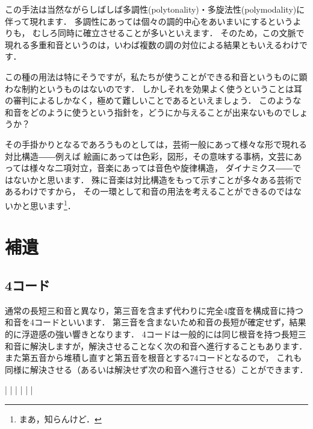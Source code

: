 \documentclass[dvipdfmx,uplatex,b5paper,openany,jbase=12Q,nomag*,textwidth-limit=44%
               ]{gachimuchi}[2020/05/05]
\begin{document}
この手法は当然ながらしばしば多調性(polytonality)・多旋法性(polymodality)に伴って現れます．
多調性にあっては個々の調的中心をあいまいにするというよりも，
むしろ同時に確立させることが多いといえます．
そのため，この文脈で現れる多重和音というのは，いわば複数の調の対位による結果ともいえるわけです．

この種の用法は特にそうですが，私たちが使うことができる和音というものに顕わな制約というものはないのです．
しかしそれを効果よく使うということは耳の審判によるしかなく，極めて難しいことであるといえましょう．
このような和音をどのように使うという指針を，どうにか与えることが出来ないものでしょうか？

その手掛かりとなるであろうものとしては，芸術一般にあって様々な形で現れる対比構造――例えば
絵画にあっては色彩，図形，その意味する事柄，文芸にあっては様々な二項対立，音楽にあっては音色や旋律構造，
ダイナミクス――ではないかと思います．
殊に音楽は対比構造をもって示すことが多々ある芸術であるわけですから，
その一環として和音の用法を考えることができるのではないかと思います\footnote{まあ，知らんけど．
}．

\chapter{補遺}
\section{\Sus4コード}
通常の長短三和音と異なり，第三音を含まず代わりに完全4度音を構成音に持つ和音を\Sus4コードといいます．
第三音を含まないため和音の長短が確定せず，結果的に浮遊感の強い響きとなります．
\Sus4コードは一般的には同じ根音を持つ長短三和音に解決しますが，解決させることなく次の和音へ進行することもあります．
また第五音から堆積し直すと第五音を根音とする7\Sus4コードとなるので，
これも同様に解決させる（あるいは解決せず次の和音へ進行させる）ことができます．

\begin{Music}[0.8\linewidth]
  \generalmeter{\meterC}%
  \Startpiece
  \NOTes%
  |%
  \en\bar
  \NOTes%
  |%
  \en\doublebar%
  \NOTes%
  |%
  \en\bar
  \NOTes%
  |%
  \en\setdoublebar
  \endpiece
\end{Music}
\end{document}

